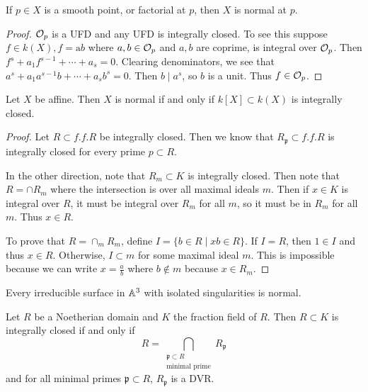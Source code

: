 \documentclass[twoside, 10pt]{article}
\begin{document}
    \begin{lem}
        If $p \in X$ is a smooth point, or factorial at $p$, then $X$ is normal at $p$.
        \begin{proof}
            $\mathcal{O}_p$ is a UFD and any UFD is integrally closed. To see this suppose $f \in k(X), f= \mathrm{a}{b}$ where $a,b \in \mathcal{O}_p$ and $a,b$ are coprime, is integral over $\mathcal{O}_p$. Then $f^s + a_1 f^{s-1} + \cdots + a_s = 0$. Clearing denominators, we see that $a^s + a_1a^{s-1}b + \cdots + a_sb^s = 0$. Then $b \mid a^s$, so $b$ is a unit. Thus $f \in \mathcal{O}_p$.
        \end{proof}
    \end{lem}

    \begin{lem}
        Let $X$ be affine. Then $X$ is normal if and only if $k[X] \subset k(X)$ is integrally closed.
        \begin{proof}
            Let $R \subset f.f.R$ be integrally closed. Then we know that $R_{\mathfrak{p}} \subset f.f.R$ is integrally closed for every prime $p \subset R$.

            In the other direction, note that $R_m \subset K$ is integrally closed. Then note that $R = \cap R_m$ where the intersection is over all maximal ideals $m$. Then if $x \in K$ is integral over $R$, it must be integral over $R_m$ for all $m$, so it must be in $R_m$ for all $m$. Thus $x \in R$.

            To prove that $R = \cap_m R_m$, define $I = \{b \in R \mid xb \in R \}$. If $I=R$, then $1 \in I$ and thus $x \in R$. Otherwise, $I \subset m$ for some maximal ideal $m$. This is impossible because we can write $x=\frac{a}{b}$ where $b \notin m$ because $x \in R_m$.
        \end{proof}
    \end{lem}

    \begin{rmk}
        Every irreducible surface in $\mathbb{A}^3$ with isolated singularities is normal.
    \end{rmk}

    \begin{thm}
        Let $R$ be a Noetherian domain and $K$ the fraction field of $R$. Then $R \subset K$ is integrally closed if and only if
        \[R = \bigcap_{\substack{\mathfrak{p} \subset R \\ \text{minimal prime}}} R_{\mathfrak{p}}\] and for all minimal primes $\mathfrak{p} \subset R$, $R_{\mathfrak{p}}$ is a DVR.
    \end{thm}
\end{document}
